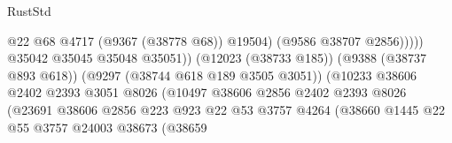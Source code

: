 \begin{lexlean}{RustStd}
\begin{coremodule}
                                                              @22
                                                              @68
                                                              @4717
                                                              (@9367 (@38778 @68))
                                                              @19504)
                                                            (@9586 @38707 @2856)))))
                                                    @35042
                                                    @35045
                                                    @35048
                                                    @35051))
                                                (@12023 (@38733 @185))
                                                (@9388 (@38737 @893 @618))
                                                (@9297 (@38744 @618 @189 @3505 @3051))
                                                (@10233
                                                  @38606
                                                  @2402
                                                  @2393
                                                  @3051
                                                  @8026
                                                  (@10497
                                                    @38606
                                                    @2856
                                                    @2402
                                                    @2393
                                                    @8026
                                                    (@23691
                                                      @38606
                                                      @2856
                                                      @223
                                                      @923
                                                      @22
                                                      @53
                                                      @3757
                                                      @4264
                                                      (@38660
                                                        @1445
                                                        @22
                                                        @55
                                                        @3757
                                                        @24003
                                                        @38673
                                                        (@38659

\end{coremodule}
\end{lexlean}
